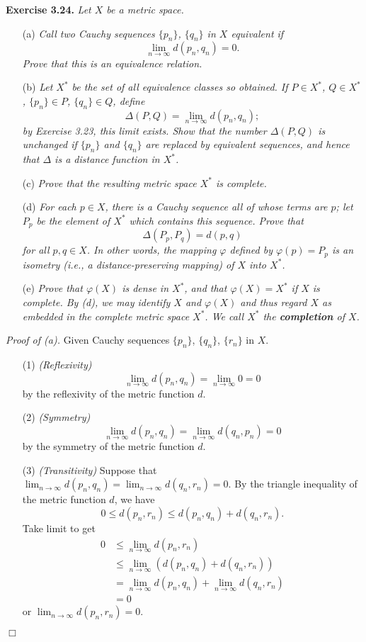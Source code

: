 \documentclass{article}
\begin{document}
\textbf{Exercise 3.24.}
\emph{Let $X$ be a metric space.}
\begin{enumerate}
\item[(a)]
\emph{Call two Cauchy sequences $\{p_n\}$, $\{q_n\}$ in $X$ equivalent if
$$\lim_{n \to \infty}{d(p_n,q_n)} = 0.$$
Prove that this is an equivalence relation.}
\item[(b)]
\emph{Let $X^*$ be the set of all equivalence classes so obtained.
If $P \in X^*$, $Q \in X^*$, $\{p_n\} \in P$, $\{q_n\} \in Q$, define
$$\Delta(P,Q) = \lim_{n \to \infty} d(p_n,q_n);$$
by Exercise 3.23, this limit exists.
Show that the number
$\Delta(P,Q)$ is unchanged if $\{p_n\}$ and $\{q_n\}$ are replaced by equivalent sequences,
and hence that $\Delta$ is a distance function in $X^*$.}
\item[(c)]
\emph{Prove that the resulting metric space $X^*$ is complete.}
\item[(d)]
\emph{For each $p \in X$, there is a Cauchy sequence all of whose terms are $p$;
let $P_p$ be the element of $X^*$ which contains this sequence.
Prove that
$$\Delta(P_p,P_q) = d(p,q)$$
for all $p,q \in X$.
In other words, the mapping $\varphi$ defined by $\varphi(p) = P_p$
is an isometry
(i.e., a distance-preserving mapping) of $X$ into $X^*$.}
\item[(e)]
\emph{Prove that $\varphi(X)$ is dense in $X^*$, and that $\varphi(X) = X^*$ if $X$ is complete.
By (d), we may identify $X$ and $\varphi(X)$
and thus regard $X$ as embedded in the complete metric space $X^*$.
We call $X^*$ the \textbf{completion} of $X$.} \\
\end{enumerate}



\emph{Proof of (a).}
Given Cauchy sequences $\{p_n\}$, $\{q_n\}$, $\{r_n\}$ in $X$.
\begin{enumerate}
\item[(1)]
\emph{(Reflexivity)}
$$\lim_{n \to \infty}{d(p_n,q_n)} = \lim_{n \to \infty} 0 = 0$$
by the reflexivity of the metric function $d$.
\item[(2)]
\emph{(Symmetry)}
$$\lim_{n \to \infty}{d(p_n,q_n)} = \lim_{n \to \infty}{d(q_n,p_n)} = 0$$
by the symmetry of the metric function $d$.
\item[(3)]
\emph{(Transitivity)}
Suppose that $\lim_{n \to \infty}{d(p_n,q_n)} = \lim_{n \to \infty}{d(q_n,r_n)} = 0$.
By the triangle inequality of the metric function $d$,
we have
$$0 \leq d(p_n,r_n) \leq d(p_n,q_n)+d(q_n,r_n).$$
Take limit to get
\begin{align*}
0
&\leq \lim_{n \to \infty}d(p_n,r_n) \\
&\leq \lim_{n \to \infty}(d(p_n,q_n)+d(q_n,r_n)) \\
&= \lim_{n \to \infty}d(p_n,q_n) + \lim_{n \to \infty}d(q_n,r_n) \\
&= 0
\end{align*}
or $\lim_{n \to \infty}d(p_n,r_n) = 0$.
\end{enumerate}
$\Box$ \\
\end{document}

